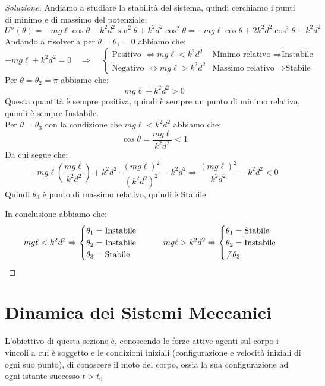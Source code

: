 \documentclass[11pt,a4paper,twoside]{article}
\theoremstyle{definition}
\newenvironment{sol}
	{\renewcommand\qedsymbol{$\blacksquare$}\begin{proof}[Soluzione]}
	{\end{proof}}
\begin{document}
\begin{sol}
	Andiamo a studiare la stabilità del sistema, quindi cerchiamo i punti di minimo e di massimo del potenziale:
	\[ U''(\theta) = -mg\ell \cos \theta -k^2d^2 \sin^2 \theta + k^2d^2 \cos^2\theta = - mg\ell\cos \theta + 2 k^2d^2 \cos^2 \theta - k^2d^2 \]
	Andando a risolverla per $\theta = \theta_1 = 0$ abbiamo che:
	\[ -mg\ell + k^2d^2 = 0 \quad \Rightarrow \quad \begin{cases}
		\text{Positivo }\Leftrightarrow mg\ell < k^2d^2 & \text{Minimo relativo }\Rightarrow \text{Instabile}\\
		\text{Negativo }\Leftrightarrow mg\ell > k^2d^2 & \text{Massimo relativo }\Rightarrow \text{Stabile}
	\end{cases}\]
	Per $\theta = \theta_2 = \pi$ abbiamo che:
	\[ mg\ell + k^2d^2 >0 \]
	Questa quantità è sempre positiva, quindi è sempre un punto di minimo relativo, quindi è sempre Instabile.\\
	Per $\theta = \theta_3$ con la condizione che $mg\ell < k^2d^2$ abbiamo che:
	\[ \cos \theta = \frac{mg\ell}{k^2d^2}<1 \]
	Da cui segue che:
	\[ -mg\ell\left( \frac{mg\ell}{k^2d^2} \right) + k^2d^2 \cdot \frac{(mg\ell)^2}{(k^2d^2)^2} - k^2d^2 \Rightarrow \frac{(mg\ell)^2}{k^2d^2} - k^2d^2< 0 \]
	Quindi $\theta_3$ è punto di massimo relativo, quindi è Stabile

	In conclusione abbiamo che:
	\[
		mg\ell < k^2d^2 \Rightarrow \begin{cases}
			\theta_1 = \text{Instabile}\\
			\theta_2 = \text{Instabile}\\
			\theta_3 = \text{Stabile}
		\end{cases} \qquad mg\ell > k^2d^2 \Rightarrow \begin{cases}
			\theta_1 = \text{Stabile}\\
			\theta_2 = \text{Instabile}\\
			\not \exists \theta_3
		\end{cases}
	\]
\end{sol}

\newpage

\section{Dinamica dei Sistemi Meccanici}

L'obiettivo di questa sezione è, conoscendo le forze attive agenti sul corpo i vincoli a cui è soggetto e le condizioni iniziali (configurazione e velocità iniziali di ogni suo punto), di conoscere il moto del corpo, ossia la sua configurazione ad ogni istante successo $t>t_0$
\end{document}
